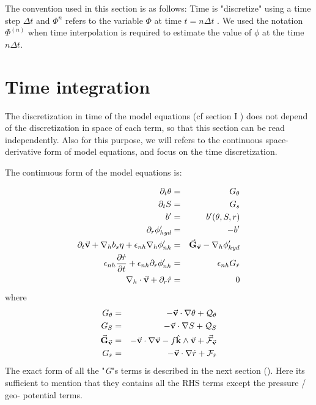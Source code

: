 
The convention used in this section is as follows:
Time is "discretize" using a time step $\Delta t$   
and $\Phi^n$ refers to the variable $\Phi$ 
at time $t = n \Delta t$ . We used the notation $\Phi^{(n)}$
when time interpolation is required to estimate the value of $\phi$
at the time $n \Delta t$.

\section{Time integration}

The discretization in time of the model equations (cf section I )
does not depend of the discretization in space of each
term, so that this section can be read independently.
Also for this purpose, we will refers to the continuous 
space-derivative form of model equations, and focus on 
the time discretization.
 
The continuous form of the model equations is:

\begin{eqnarray}
\partial_t \theta & = & G_\theta
\\
\partial_t S & = & G_s
\\
b' & = & b'(\theta,S,r)
\\
\partial_r \phi'_{hyd} & = & -b'
\label{eq-r-split-hyd}
\\
\partial_t \vec{\bf v}
+ {\bf \nabla}_h b_s \eta
+ \epsilon_{nh} {\bf \nabla}_h \phi'_{nh}
& = & \vec{\bf G}_{\vec{\bf v}} 
- {\bf \nabla}_h \phi'_{hyd}
\label{eq-r-split-hmom}
\\
\epsilon_{nh} \frac {\partial{\dot{r}}}{\partial{t}}
+ \epsilon_{nh} \partial_r \phi'_{nh}
& = & \epsilon_{nh} G_{\dot{r}} 
\label{eq-r-split-rdot}
\\
{\bf \nabla}_h \cdot \vec{\bf v} + \partial_r \dot{r}
& = & 0
\label{eq-r-cont}
\end{eqnarray}
where
\begin{eqnarray*}
G_\theta & = &
- \vec{\bf v} \cdot {\bf \nabla} \theta + {\cal Q}_\theta
\\
G_S & = &
- \vec{\bf v} \cdot {\bf \nabla} S + {\cal Q}_S
\\
\vec{\bf G}_{\vec{\bf v}}
& = &
- \vec{\bf v} \cdot {\bf \nabla} \vec{\bf v}
- f \hat{\bf k} \wedge \vec{\bf v}
+ \vec{\cal F}_{\vec{\bf v}}
\\
G_{\dot{r}}
& = &
- \vec{\bf v} \cdot {\bf \nabla} \dot{r}
+ {\cal F}_{\dot{r}}
\end{eqnarray*}
The exact form of all the "{\it G}"s terms is described in the next
section (). Here its sufficient to mention that they contains
all the RHS terms except the pressure / geo- potential terms.

